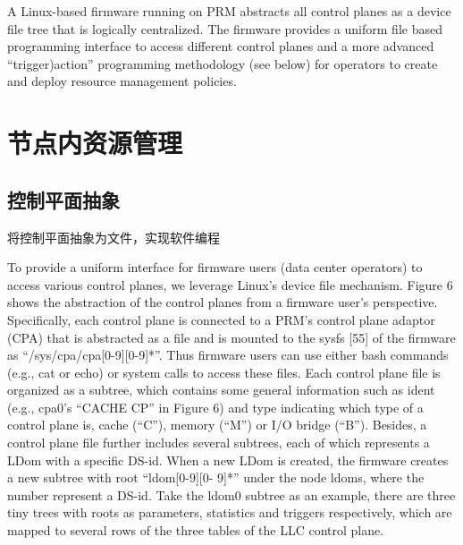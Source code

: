 A Linux-based firmware running on PRM abstracts all control
planes as a device file tree that is logically centralized. The
firmware provides a uniform file based programming interface to
access different control planes and a more advanced “trigger)action”
programming methodology (see below) for operators to create and
deploy resource management policies.


\section{节点内资源管理}

\subsection{控制平面抽象}

将控制平面抽象为文件，实现软件编程

To provide a uniform interface for firmware users (data center operators)
to access various control planes, we leverage Linux’s device
file mechanism. Figure 6 shows the abstraction of the control planes
from a firmware user’s perspective. Specifically, each control plane
is connected to a PRM’s control plane adaptor (CPA) that is abstracted
as a file and is mounted to the sysfs [55] of the firmware as
“/sys/cpa/cpa[0-9][0-9]*”. Thus firmware users can use either bash
commands (e.g., cat or echo) or system calls to access these files.
Each control plane file is organized as a subtree, which contains
some general information such as ident (e.g., cpa0’s “CACHE CP”
in Figure 6) and type indicating which type of a control plane
is, cache (“C”), memory (“M”) or I/O bridge (“B”). Besides, a
control plane file further includes several subtrees, each of which
represents a LDom with a specific DS-id. When a new LDom is
created, the firmware creates a new subtree with root “ldom[0-9][0-
9]*” under the node ldoms, where the number represent a DS-id.
Take the ldom0 subtree as an example, there are three tiny trees
with roots as parameters, statistics and triggers respectively, which
are mapped to several rows of the three tables of the LLC control
plane.

